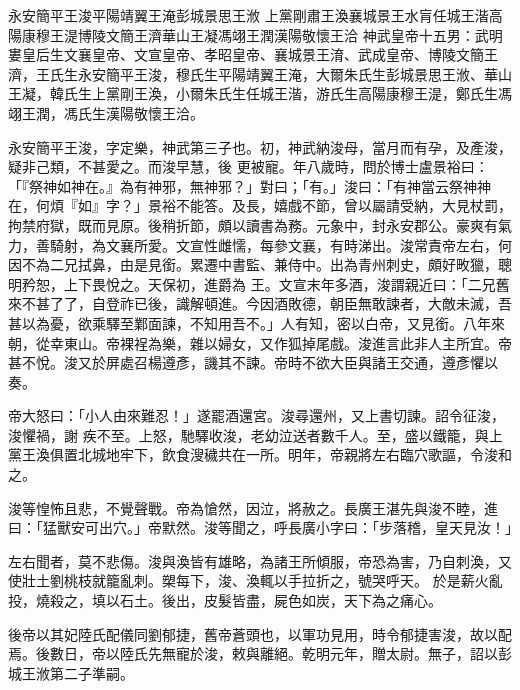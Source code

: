
\begin{pinyinscope}

 永安簡平王浚平陽靖翼王淹彭城景思王浟
 上黨剛肅王渙襄城景王水肓任城王湝高陽康穆王湜博陵文簡王濟華山王凝馮翊王潤漢陽敬懷王洽
 神武皇帝十五男：武明婁皇后生文襄皇帝、文宣皇帝、孝昭皇帝、襄城景王淯、武成皇帝、博陵文簡王濟，王氏生永安簡平王浚，穆氏生平陽靖翼王淹，大爾朱氏生彭城景思王浟、華山王凝，韓氏生上黨剛王渙，小爾朱氏生任城王湝，游氏生高陽康穆王湜，鄭氏生馮翊王潤，馮氏生漢陽敬懷王洽。



 永安簡平王浚，字定樂，神武第三子也。初，神武納浚母，當月而有孕，及產浚，疑非己類，不甚愛之。而浚早慧，後
 更被寵。年八歲時，問於博士盧景裕曰：「『祭神如神在。』為有神邪，無神邪？」對曰；「有。」浚曰：「有神當云祭神神在，何煩『如』字？」景裕不能答。及長，嬉戲不節，曾以屬請受納，大見杖罰，拘禁府獄，既而見原。後稍折節，頗以讀書為務。元象中，封永安郡公。豪爽有氣力，善騎射，為文襄所愛。文宣性雌懦，每參文襄，有時涕出。浚常責帝左右，何因不為二兄拭鼻，由是見銜。累遷中書監、兼侍中。出為青州刺史，頗好畋獵，聰明矜恕，上下畏悅之。天保初，進爵為
 王。文宣末年多酒，浚謂親近曰：「二兄舊來不甚了了，自登祚已後，識解頓進。今因酒敗德，朝臣無敢諫者，大敵未滅，吾甚以為憂，欲乘驛至鄴面諫，不知用吾不。」人有知，密以白帝，又見銜。八年來朝，從幸東山。帝裸裎為樂，雜以婦女，又作狐掉尾戲。浚進言此非人主所宜。帝甚不悅。浚又於屏處召楊遵彥，譏其不諫。帝時不欲大臣與諸王交通，遵彥懼以奏。



 帝大怒曰：「小人由來難忍！」遂罷酒還宮。浚尋還州，又上書切諫。詔令征浚，浚懼禍，謝
 疾不至。上怒，馳驛收浚，老幼泣送者數千人。至，盛以鐵籠，與上黨王渙俱置北城地牢下，飲食溲穢共在一所。明年，帝親將左右臨穴歌謳，令浚和之。



 浚等惶怖且悲，不覺聲戰。帝為愴然，因泣，將赦之。長廣王湛先與浚不睦，進曰：「猛獸安可出穴。」帝默然。浚等聞之，呼長廣小字曰：「步落稽，皇天見汝！」



 左右聞者，莫不悲傷。浚與渙皆有雄略，為諸王所傾服，帝恐為害，乃自刺渙，又使壯土劉桃枝就籠亂刺。槊每下，浚、渙輒以手拉折之，號哭呼天。
 於是薪火亂投，燒殺之，填以石土。後出，皮髮皆盡，屍色如炭，天下為之痛心。



 後帝以其妃陸氏配儀同劉郁捷，舊帝蒼頭也，以軍功見用，時令郁捷害浚，故以配焉。後數日，帝以陸氏先無寵於浚，敕與離絕。乾明元年，贈太尉。無子，詔以彭城王浟第二子準嗣。




\end{pinyinscope}
